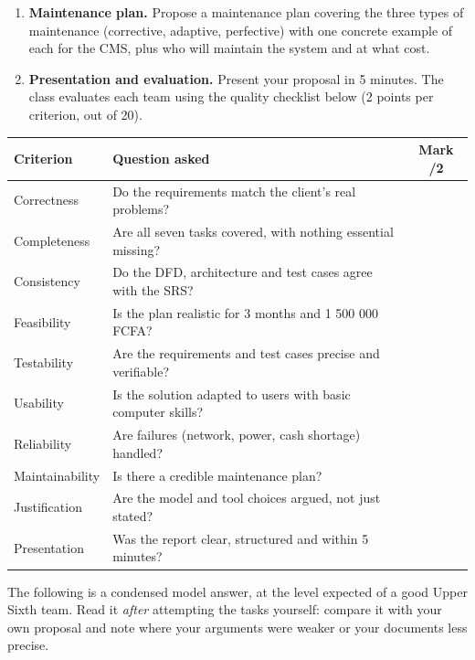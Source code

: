 \documentclass[11pt]{article}
\newcounter{popsec}
\newcounter{popsub}
\newcommand{\courssub}[1]{%
  \stepcounter{popsub}%
  \par\vspace{9pt}\noindent{\popxbold\fontsize{11.5}{13}\selectfont\color{popink}{\color{poporange}\thepopsec.\thepopsub}\hspace{6pt}#1}\par\nopagebreak\vspace{4pt}
}
\begin{document}
\begin{enumerate}
\item \textbf{Maintenance plan.} Propose a maintenance plan covering the three types of maintenance (corrective, adaptive, perfective) with one concrete example of each for the CMS, plus who will maintain the system and at what cost.
\item \textbf{Presentation and evaluation.} Present your proposal in 5 minutes. The class evaluates each team using the quality checklist below (2 points per criterion, out of 20).
\end{enumerate}

\begin{center}
\begin{tabularx}{\linewidth}{|l|X|c|}
\hline
\rowcolor{popblueL} \textbf{Criterion} & \textbf{Question asked} & \textbf{Mark /2} \\
\hline
Correctness & Do the requirements match the client's real problems? & \\
\hline
Completeness & Are all seven tasks covered, with nothing essential missing? & \\
\hline
Consistency & Do the DFD, architecture and test cases agree with the SRS? & \\
\hline
Feasibility & Is the plan realistic for 3 months and 1 500 000 FCFA? & \\
\hline
Testability & Are the requirements and test cases precise and verifiable? & \\
\hline
Usability & Is the solution adapted to users with basic computer skills? & \\
\hline
Reliability & Are failures (network, power, cash shortage) handled? & \\
\hline
Maintainability & Is there a credible maintenance plan? & \\
\hline
Justification & Are the model and tool choices argued, not just stated? & \\
\hline
Presentation & Was the report clear, structured and within 5 minutes? & \\
\hline
\end{tabularx}
\end{center}

\courssub{Model answer}

The following is a condensed model answer, at the level expected of a good Upper Sixth team. Read it \emph{after} attempting the tasks yourself: compare it with your own proposal and note where your arguments were weaker or your documents less precise.
\end{document}
